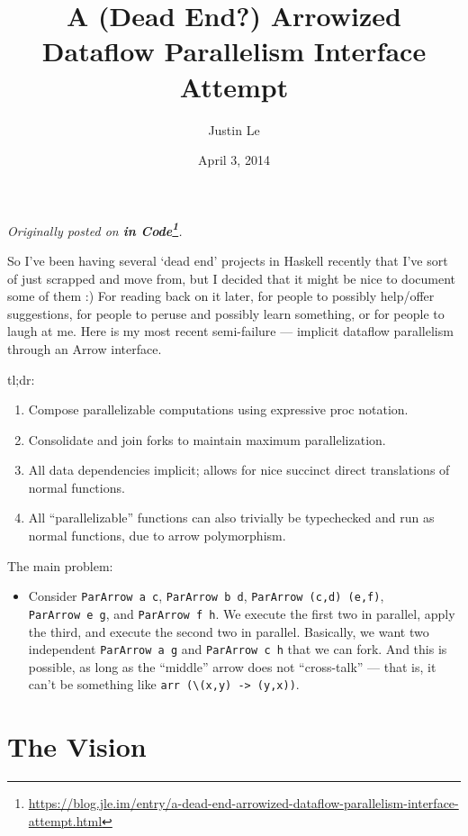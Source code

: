 \documentclass[]{article}
\title{A (Dead End?) Arrowized Dataflow Parallelism Interface Attempt}
\author{Justin Le}
\date{April 3, 2014}
\renewcommand{\href}[2]{#2\footnote{\url{#1}}}
\begin{document}
\maketitle

\emph{Originally posted on
\textbf{\href{https://blog.jle.im/entry/a-dead-end-arrowized-dataflow-parallelism-interface-attempt.html}{in
Code}}.}

So I've been having several `dead end' projects in Haskell recently that I've
sort of just scrapped and move from, but I decided that it might be nice to
document some of them :) For reading back on it later, for people to possibly
help/offer suggestions, for people to peruse and possibly learn something, or
for people to laugh at me. Here is my most recent semi-failure --- implicit
dataflow parallelism through an Arrow interface.

tl;dr:

\begin{enumerate}
\def\labelenumi{\arabic{enumi}.}
\tightlist
\item
  Compose parallelizable computations using expressive proc notation.
\item
  Consolidate and join forks to maintain maximum parallelization.
\item
  All data dependencies implicit; allows for nice succinct direct translations
  of normal functions.
\item
  All ``parallelizable'' functions can also trivially be typechecked and run as
  normal functions, due to arrow polymorphism.
\end{enumerate}

The main problem:

\begin{itemize}
\tightlist
\item
  Consider \texttt{ParArrow\ a\ c}, \texttt{ParArrow\ b\ d},
  \texttt{ParArrow\ (c,d)\ (e,f)}, \texttt{ParArrow\ e\ g}, and
  \texttt{ParArrow\ f\ h}. We execute the first two in parallel, apply the
  third, and execute the second two in parallel. Basically, we want two
  independent \texttt{ParArrow\ a\ g} and \texttt{ParArrow\ c\ h} that we can
  fork. And this is possible, as long as the ``middle'' arrow does not
  ``cross-talk'' --- that is, it can't be something like
  \texttt{arr\ (\textbackslash{}(x,y)\ -\textgreater{}\ (y,x))}.
\end{itemize}

\section{The Vision}\label{the-vision}
\end{document}
